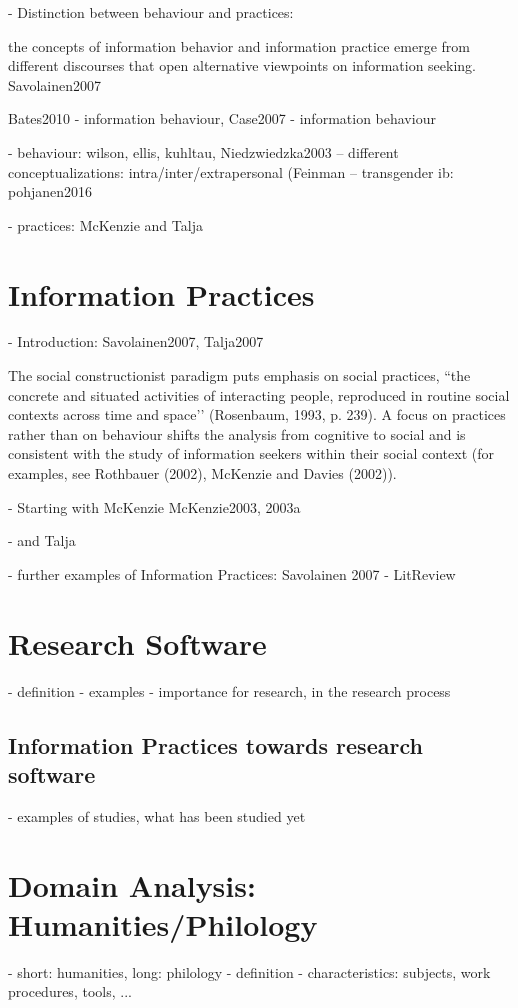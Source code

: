 \documentclass[12pt,a4paper,titlepage,oneside,abstract=true,toc=listof,toc=bibliography]{scrreprt}
\begin{document}
- Distinction between behaviour and practices: 

	the concepts of information behavior and information practice emerge from different discourses that open alternative viewpoints on information seeking. Savolainen2007 

	Bates2010 - information behaviour, Case2007 - information behaviour

- behaviour: wilson, ellis, kuhltau, Niedzwiedzka2003
-- different conceptualizations: intra/inter/extrapersonal (Feinman
-- transgender ib: pohjanen2016

- practices: McKenzie and Talja 

\section{Information Practices}
- Introduction:
	Savolainen2007, Talja2007

The social constructionist paradigm puts emphasis on social practices, ``the concrete and situated activities of interacting people, reproduced in routine social contexts across time and space’’ (Rosenbaum, 1993, p. 239). A focus on
practices rather than on behaviour shifts the analysis from cognitive to social and is consistent with the study of information seekers within their social context (for examples, see Rothbauer (2002), McKenzie and Davies (2002)).

- Starting with McKenzie
	McKenzie2003, 2003a

- and Talja

- further examples of Information Practices: Savolainen 2007 - LitReview

\section{Research Software}
- definition
- examples
- importance for research, in the research process

\subsection{Information Practices towards research software}
- examples of studies, what has been studied yet

\section{Domain Analysis: Humanities/Philology}
- short: humanities, long: philology
- definition
- characteristics: subjects, work procedures, tools, ...
\end{document}

